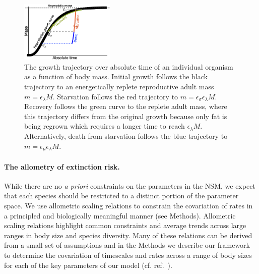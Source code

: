 \documentclass[twocolumn,preprintnumbers,amsmath,amssymb,superscriptaddress]{revtex4}
\begin{document}
\begin{figure}
\centering
\includegraphics[width=0.4\textwidth]{Growth-trajectory-diagram.eps}
\caption{\small{ The growth trajectory over absolute time of an individual organism as a function of body mass.  
Initial growth follows the black trajectory to an energetically replete reproductive adult mass $m=\epsilon_\lambda M$. %
Starvation follows the red trajectory to $m = \epsilon_\sigma \epsilon_\lambda  M$. 
Recovery follows the green curve to the replete adult mass, where this trajectory differs from the original growth because only fat is being regrown which requires a longer time to reach $\epsilon_\lambda M$. %
Alternatively, death from starvation follows the blue trajectory to $m=\epsilon_\mu \epsilon_\lambda  M$.}\label{fig:growth}}
\end{figure}

\noindent \paragraph*{{\bf The allometry of extinction risk.}} While there are no {\it a priori} constraints on the parameters in the NSM, we expect that each species should be restricted to a distinct portion of the parameter space.  We
use allometric scaling relations to constrain the covariation of rates in a
principled and biologically meaningful manner (see Methods).  Allometric scaling relations
highlight common constraints and average trends across large ranges in body
size and species diversity. Many of these relations can be derived from a
small set of assumptions and in the Methods we describe our framework to determine the
covariation of timescales and rates across a range of body sizes for each of
the key parameters of our model (cf. ref.~\citep{Yodzis:1992hg}).  
\end{document}
